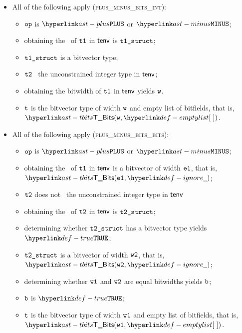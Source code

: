 \begin{itemize}
  \item All of the following apply (\textsc{plus\_minus\_bits\_int}):
  \begin{itemize}
    \item $\texttt{op}$ is $\PLUS$ or $\MINUS$;
    \item obtaining the \structure\ of $\texttt{t1}$ in $\textsf{tenv}$ is $\texttt{t1\_struct}$\ProseOrTypeError;
    \item $\texttt{t1\_struct}$ is a bitvector type;
    \item $\texttt{t2}$ \typesatisfies\ the unconstrained integer type in $\textsf{tenv}$;
    \item obtaining the bitwidth of $\texttt{t1}$ in $\textsf{tenv}$ yields $\texttt{w}$.
    \item $\texttt{t}$ is the bitvector type of width $\texttt{w}$ and empty list of bitfields, that is, \\ $\TBits(\vw, \emptylist)$.
  \end{itemize}

  \item All of the following apply (\textsc{plus\_minus\_bits\_bits}):
  \begin{itemize}
    \item $\texttt{op}$ is $\PLUS$ or $\MINUS$;
    \item obtaining the \structure\ of $\texttt{t1}$ in $\textsf{tenv}$ is a bitvector of width $\texttt{e1}$, that is,\\ $\TBits(\veone, \Ignore)$;
    \item $\texttt{t2}$ does not \typesatisfy\ the unconstrained integer type in $\textsf{tenv}$
    \item obtaining the \structure\ of $\texttt{t2}$ in $\textsf{tenv}$ is $\texttt{t2\_struct}$\ProseOrTypeError;
    \item determining whether $\texttt{t2\_struct}$ has a bitvector type yields $\True$\ProseOrTypeError;
    \item $\texttt{t2\_struct}$ is a bitvector of width $\texttt{w2}$, that is, $\TBits(\vwtwo, \Ignore)$;
    \item determining whether $\texttt{w1}$ and $\texttt{w2}$ are equal bitwidths yields $\texttt{b}$;
    \item $\texttt{b}$ is $\True$\ProseOrTypeError;
    \item $\texttt{t}$ is the bitvector type of width $\texttt{w1}$ and empty list of bitfields, that is, \\ $\TBits(\vwone, \emptylist)$.
  \end{itemize}


\end{itemize}

